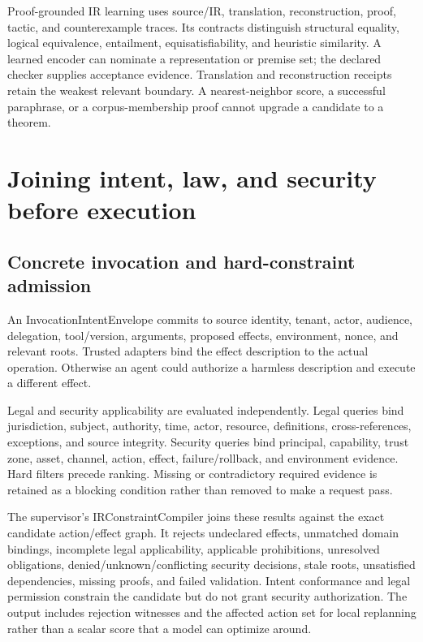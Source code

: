 \documentclass{article}
\begin{document}
Proof-grounded IR learning uses source/IR, translation, reconstruction, proof, tactic, and counterexample traces. Its contracts distinguish structural equality, logical equivalence, entailment, equisatisfiability, and heuristic similarity. A learned encoder can nominate a representation or premise set; the declared checker supplies acceptance evidence. Translation and reconstruction receipts retain the weakest relevant boundary. A nearest-neighbor score, a successful paraphrase, or a corpus-membership proof cannot upgrade a candidate to a theorem.

\section{Joining intent, law, and security before execution}

\subsection{Concrete invocation and hard-constraint admission}

An InvocationIntentEnvelope commits to source identity, tenant, actor, audience, delegation, tool/version, arguments, proposed effects, environment, nonce, and relevant roots. Trusted adapters bind the effect description to the actual operation. Otherwise an agent could authorize a harmless description and execute a different effect.

Legal and security applicability are evaluated independently. Legal queries bind jurisdiction, subject, authority, time, actor, resource, definitions, cross-references, exceptions, and source integrity. Security queries bind principal, capability, trust zone, asset, channel, action, effect, failure/rollback, and environment evidence. Hard filters precede ranking. Missing or contradictory required evidence is retained as a blocking condition rather than removed to make a request pass.

The supervisor's IRConstraintCompiler joins these results against the exact candidate action/effect graph. It rejects undeclared effects, unmatched domain bindings, incomplete legal applicability, applicable prohibitions, unresolved obligations, denied/unknown/conflicting security decisions, stale roots, unsatisfied dependencies, missing proofs, and failed validation. Intent conformance and legal permission constrain the candidate but do not grant security authorization. The output includes rejection witnesses and the affected action set for local replanning rather than a scalar score that a model can optimize around.
\end{document}
